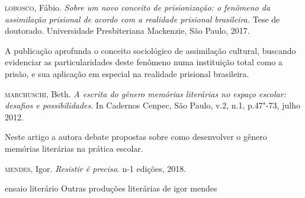 \documentclass[11pt]{extarticle}
\begin{document}
\textsc{lobosco}, Fábio. \textit{Sobre um novo conceito de prisionização: o fenômeno da
assimilação prisional de acordo com a realidade prisional brasileira.}
Tese de doutorado. Universidade Presbiteriana Mackenzie, São Paulo,
2017. 

A publicação aprofunda o conceito sociológico de assimilação
cultural, buscando evidenciar as particularidades deste fenômeno numa
instituição total como a prisão, e sua aplicação em especial na
realidade prisional brasileira.

\textsc{marchuschi}, Beth. \textit{A escrita do gênero memórias literárias no espaço
escolar: desafios e possibilidades}. In Cadernos Cenpec, São Paulo, v.2,
n.1, p.47"-73, julho 2012. 

Neste artigo a autora debate propostas sobre
como desenvolver o gênero memórias literárias na prática escolar.

\textsc{mendes}, Igor. \textit{Resistir é preciso}. n-1 edições, 2018. 

ensaio literário 
Outras produções literárias de igor mendes
\end{document}
